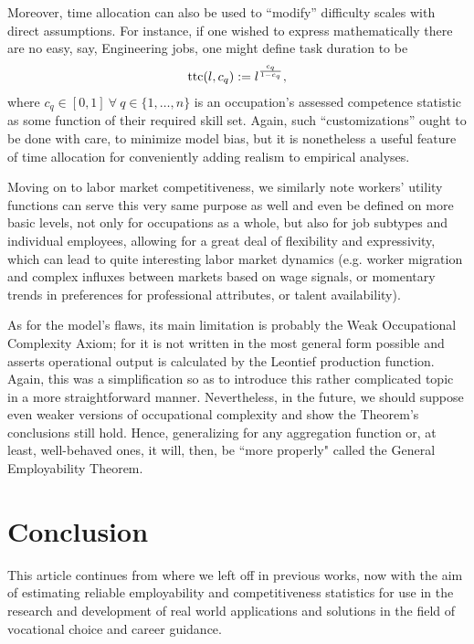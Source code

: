\documentclass[hidelinks, nonatbib]{elsarticle}
\begin{document}
Moreover, time allocation can also be used to ``modify'' difficulty scales with direct assumptions. For instance, if one wished to express mathematically there are no easy, say, Engineering jobs, one might define task duration to be
\begin{gather}
    \text{ttc}(l, c_q)
    :=
    l ^ {
        \frac{
            c_q
        }{
            1 - c_q
        }
    }
    ,
\end{gather}
where $c_q \in [0,1] \ \forall \ q \in \{1, \dots, n\}$ is an occupation's assessed competence statistic as some function of their required skill set. Again, such ``customizations'' ought to be done with care, to minimize model bias, but it is nonetheless a useful feature of time allocation for conveniently adding realism to empirical analyses.

Moving on to labor market competitiveness, we similarly note workers' utility functions can serve this very same purpose as well and even be defined on more basic levels, not only for occupations as a whole, but also for job subtypes and individual employees, allowing for a great deal of flexibility and expressivity, which can lead to quite interesting labor market dynamics (e.g. worker migration and complex influxes between markets based on wage signals, or momentary trends in preferences for professional attributes, or talent availability).

As for the model's flaws, its main limitation is probably the Weak Occupational Complexity Axiom; for it is not written in the most general form possible and asserts operational output is calculated by the Leontief production function. Again, this was a simplification so as to introduce this rather complicated topic in a more straightforward manner. Nevertheless, in the future, we should suppose even weaker versions of occupational complexity and show the Theorem's conclusions still hold. Hence, generalizing for any aggregation function or, at least, well-behaved ones, it will, then, be ``more properly" called the General Employability Theorem.

\section{Conclusion}
This article continues from where we left off in previous works, now with the aim of estimating reliable employability and competitiveness statistics for use in the research and development of real world applications and solutions in the field of vocational choice and career guidance.
\end{document}
